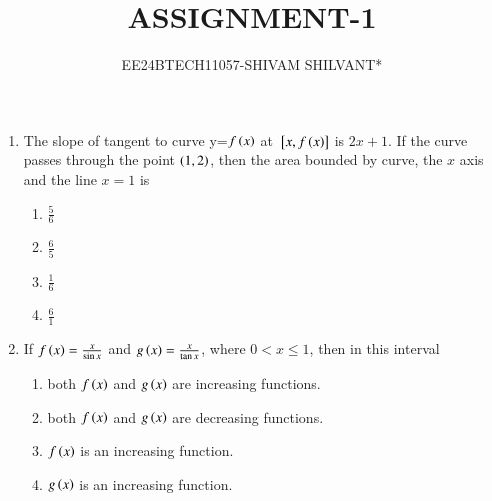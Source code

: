 \documentclass[journal]{IEEEtran}
\begin{document}

\onecolumn


\title{ASSIGNMENT-1}
\author{EE24BTECH11057-SHIVAM SHILVANT*}
\maketitle

\bigskip

\renewcommand{\thefigure}{\theenumi}
\renewcommand{\thetable}{\theenumi}
\begin{enumerate}[start=9]
\item The slope of tangent to curve y=$f\left(x\right)$ at ${}\left[x,f\left(x\right)\right]$ is $2x + 1$. If the curve passes through the point $\left(1,2\right)$, then the area bounded by curve, the $x$ axis and the line $x=1$ is
\hfill {}
\begin{multicols}{4}
\begin{enumerate}
    \item $\frac{5}{6}$\\ 
    \item $\frac{6}{5}$\\
    \item $\frac{1}{6}$\\ 
    \item $\frac{6}{1}$\\
\end{enumerate}
\end{multicols}
\item If $f\left(x\right)=\frac{x}{\sin{x}}$ and $g\left(x\right)=\frac{x}{\tan{x}}$, where $0<x\leq1$, then in this interval
\hfill {}
\begin{enumerate}
    \item both $f\left(x\right)$ and $g\left(x\right)$ are increasing functions.
    \item both $f\left(x\right)$ and $g\left(x\right)$ are decreasing functions.
    \item $f\left(x\right)$ is an increasing function.
    \item $g\left(x\right)$ is an increasing function.\\
\end{enumerate}


\end{enumerate}
\end{document}
